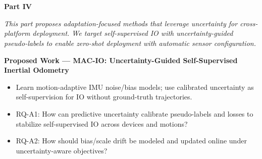 \chapter*{} %
\begin{center}
    \vspace*{3.5cm} 
{\Huge \textbf{Part IV} \\ [1cm]}
{\LARGE \textbf{\partIVTitle}}
\end{center}

\vspace{2cm}

\begin{center}
\textit{This part proposes adaptation-focused methods that leverage uncertainty for cross-platform deployment. We target self-supervised IO with uncertainty-guided pseudo-labels to enable zero-shot deployment with automatic sensor configuration.}
\end{center}

\vspace{1cm}

\noindent\textbf{Proposed Work — MAC-IO: Uncertainty-Guided Self-Supervised Inertial Odometry}
\begin{itemize}[leftmargin=1.2em]
  \item Learn motion-adaptive IMU noise/bias models; use calibrated uncertainty as self-supervision for IO without ground-truth trajectories.
  \item RQ-A1: How can predictive uncertainty calibrate pseudo-labels and losses to stabilize self-supervised IO across devices and motions?
  \item RQ-A2: How should bias/scale drift be modeled and updated online under uncertainty-aware objectives?
\end{itemize}
